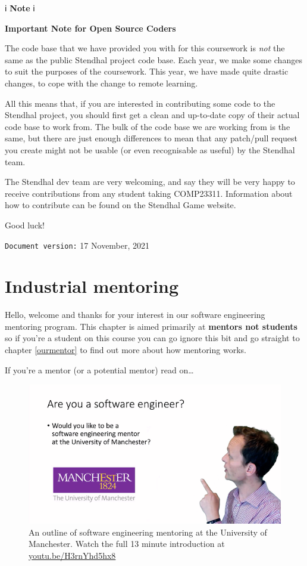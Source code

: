 \documentclass[
]{book}
\begin{document}
ℹ️ \textbf{Note} ℹ️

\textbf{Important Note for Open Source Coders}

The code base that we have provided you with for this coursework is \emph{not} the same as the public Stendhal project code base. Each year, we make some changes to suit the purposes of the coursework. This year, we have made quite drastic changes, to cope with the change to remote learning.

All this means that, if you are interested in contributing some code to the Stendhal project, you should first get a clean and up-to-date copy of their actual code base to work from. The bulk of the code base we are working from is the same, but there are just enough differences to mean that any patch/pull request you create might not be usable (or even recognisable as useful) by the Stendhal team.

The Stendhal dev team are very welcoming, and say they will be very happy to receive contributions from any student taking COMP23311. Information about how to contribute can be found on the Stendhal Game website.

Good luck!

\texttt{Document\ version:} 17 November, 2021

\hypertarget{mentoring}{%
\chapter{Industrial mentoring}\label{mentoring}}

Hello, welcome and thanks for your interest in our software engineering mentoring program. This chapter is aimed primarily at \textbf{mentors not students} so if you're a student on this course you can go ignore this bit and go straight to chapter \ref{ourmentor} to find out more about how mentoring works.

If you're a mentor (or a potential mentor) read on\ldots{}

\begin{figure}

{\centering \includegraphics[width=1\linewidth]{images/software-mentoring} 

}

\caption{An outline of software engineering mentoring at the University of Manchester. Watch the full 13 minute introduction at \href{https://youtu.be/H3rnYhd5hx8}{youtu.be/H3rnYhd5hx8}}\label{fig:mentoring-fig}
\end{figure}
\end{document}
